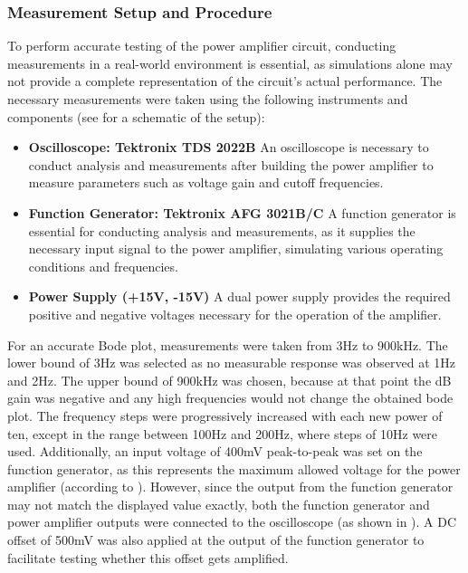 \subsubsection{Measurement Setup and Procedure}

To perform accurate testing of the power amplifier circuit, conducting measurements in a real-world environment is essential, as simulations alone may not provide a complete representation of the circuit's actual performance. The necessary measurements were taken using the following instruments and components (see  for a schematic of the setup):

\begin{itemize}
    \item \textbf{Oscilloscope: Tektronix TDS 2022B} An oscilloscope is necessary to conduct analysis and measurements after building the power amplifier  to measure parameters such as voltage gain and cutoff frequencies.
    \item \textbf{Function Generator: Tektronix AFG 3021B/C} A function generator is essential for conducting analysis and measurements, as it supplies the necessary input signal to the power amplifier, simulating various operating conditions and frequencies.
    \item \textbf{Power Supply (+15V, -15V)} A dual power supply provides the required positive and negative voltages necessary for the operation of the amplifier.
\end{itemize}

For an accurate Bode plot, measurements were taken from 3Hz to 900kHz. The lower bound of 3Hz was selected as no measurable response was observed at 1Hz and 2Hz. The upper bound of 900kHz was chosen, because at that point the dB gain was negative and any high frequencies would not change the obtained bode plot. The frequency steps were progressively increased with each new power of ten, except in the range between 100Hz and 200Hz, where steps of 10Hz were used. Additionally, an input voltage of 400mV peak-to-peak was set on the function generator, as this represents the maximum allowed voltage for the power amplifier (according to \cite{IP-manual}). However, since the output from the function generator may not match the displayed value exactly, both the function generator and power amplifier outputs were connected to the oscilloscope (as shown in ). A DC offset of 500mV was also applied at the output of the function generator to facilitate testing whether this offset gets amplified.

